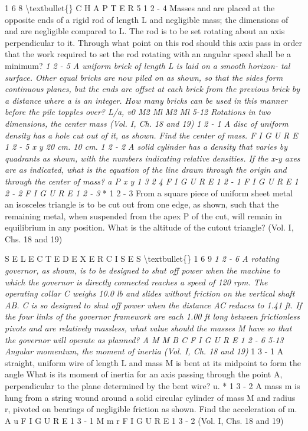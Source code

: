 \documentclass[10pt,oneside]{article}
\begin{document}
1 6 8 \textbackslash{}textbullet\{\} C H A P T E R  5 \emph{ } 1 2 - 4 Masses and are placed at the opposite ends of a rigid rod of length L and negligible mass; the dimensions of and are negligible compared to L. The rod is to be set rotating about an axis perpendicular to it. Through what point on this rod should this axis pass in order that the work required to set the rod rotating with an angular speed shall be a minimum? \emph{ } \emph{ 1 2 - 5 A uniform brick of length L is laid on a smooth horizon- tal surface. Other equal bricks are now piled on as shown, so that the sides form continuous planes, but the ends are offset at each brick from the previous brick by a distance where a is an integer. How many bricks can be used in this manner before the pile topples over? L/a, v0 M2 Ml M2 Ml 5-12 Rotations in two dimensions, the center mass (Vol. I, Ch. 18 and 19) } \emph{ 1 2 - 1 A disc of uniform density has a hole cut out of it, as shown. Find the center of mass. F I G U R E  1 2 - 5 x y 20 cm. 10 cm. } \emph{ 1 2 - 2 A solid cylinder has a density that varies by quadrants as shown, with the numbers indicating relative densities. If the x-y axes are as indicated, what is the equation of the line drawn through the origin and through the center of mass? a P x y 1 3 2 4 F I G U R E  1 2 - 1 F I G U R E  1 2 - 2 F I G U R E  1 2 - 3 } * 1 2 - 3 From a square piece of uniform sheet metal an isosceles triangle is to be cut out from one edge, as shown, such that the remaining metal, when suspended from the apex P of the cut, will remain in equilibrium in any position. What is the altitude of the cutout triangle? (Vol. I, Chs. 18 and 19)\par

S E L E C T E D  E X E R C I S E S \textbackslash{}textbullet\{\} 1 6 9 \emph{ } \emph{ 1 2 - 6 A rotating governor, as shown, is to be designed to shut off power when the machine to which the governor is directly connected reaches a speed of 120 rpm. The operating collar C weighs 10.0 lb and slides without friction on the vertical shaft AB. C is so designed to shut off power when the distance AC reduces to 1.41 ft. If the four links of the governor framework are each 1.00 ft long between frictionless pivots and are relatively massless, what value should the masses M have so that the governor will operate as planned? A M M B C F I G U R E  1 2 - 6 5-13 Angular momentum, the moment of inertia (Vol. I, Ch. 18 and 19) } 1 3 - 1 A straight, uniform wire of length L and mass M is bent at its midpoint to form the angle What is its moment of inertia for an axis passing through the point A, perpendicular to the plane determined by the bent wire? u. * 1 3 - 2 A mass m is hung from a string wound around a solid circular cylinder of mass M and radius r, pivoted on bearings of negligible friction as shown. Find the acceleration of m. A u F I G U R E  1 3 - 1 M m r F I G U R E  1 3 - 2 (Vol. I, Chs. 18 and 19)\par
\end{document}
